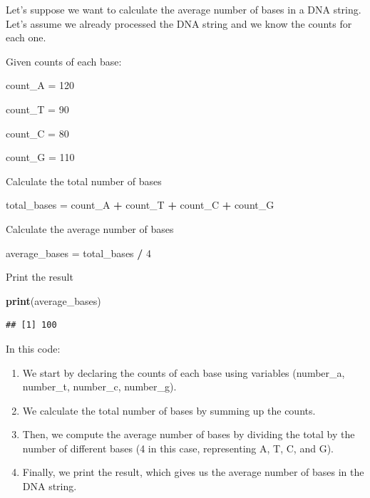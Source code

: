 \documentclass[
]{book}
\newenvironment{Shaded}{\begin{snugshade}}{\end{snugshade}}
\newcommand{\DecValTok}[1]{\textcolor[rgb]{0.00,0.00,0.81}{#1}}
\newcommand{\FunctionTok}[1]{\textcolor[rgb]{0.13,0.29,0.53}{\textbf{#1}}}
\newcommand{\NormalTok}[1]{#1}
\newcommand{\OtherTok}[1]{\textcolor[rgb]{0.56,0.35,0.01}{#1}}
\newcommand{\SpecialCharTok}[1]{\textcolor[rgb]{0.81,0.36,0.00}{\textbf{#1}}}
\begin{document}
Let's suppose we want to calculate the average number of bases in a DNA string. Let's assume we already processed the DNA string and we know the counts for each one.

Given counts of each base:

\begin{Shaded}
\begin{Highlighting}[]
\NormalTok{count\_A }\OtherTok{=} \DecValTok{120}

\NormalTok{count\_T }\OtherTok{=} \DecValTok{90}

\NormalTok{count\_C }\OtherTok{=} \DecValTok{80}

\NormalTok{count\_G }\OtherTok{=} \DecValTok{110}
\end{Highlighting}
\end{Shaded}

Calculate the total number of bases

\begin{Shaded}
\begin{Highlighting}[]
\NormalTok{total\_bases }\OtherTok{=}\NormalTok{ count\_A }\SpecialCharTok{+}\NormalTok{ count\_T }\SpecialCharTok{+}\NormalTok{ count\_C }\SpecialCharTok{+}\NormalTok{ count\_G}
\end{Highlighting}
\end{Shaded}

Calculate the average number of bases

\begin{Shaded}
\begin{Highlighting}[]
\NormalTok{average\_bases }\OtherTok{=}\NormalTok{ total\_bases }\SpecialCharTok{/} \DecValTok{4}
\end{Highlighting}
\end{Shaded}

Print the result

\begin{Shaded}
\begin{Highlighting}[]
\FunctionTok{print}\NormalTok{(average\_bases) }
\end{Highlighting}
\end{Shaded}

\begin{verbatim}
## [1] 100
\end{verbatim}

In this code:

\begin{enumerate}
\def\labelenumi{\arabic{enumi}.}
\item
  We start by declaring the counts of each base using variables (number\_a, number\_t, number\_c, number\_g).
\item
  We calculate the total number of bases by summing up the counts.
\item
  Then, we compute the average number of bases by dividing the total by the number of different bases (4 in this case, representing A, T, C, and G).
\item
  Finally, we print the result, which gives us the average number of bases in the DNA string.
\end{enumerate}
\end{document}

